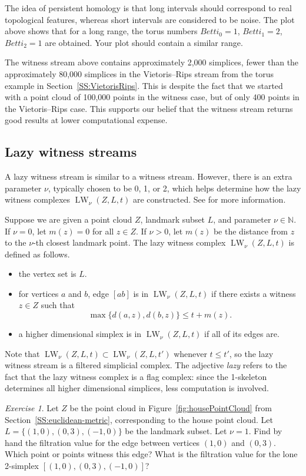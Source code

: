 \documentclass[amscd, amssymb, verbatim]{amsart}[12pt]
\theoremstyle{remark}
\newtheorem{exercise}{Exercise}
\theoremstyle{remark}
\theoremstyle{remark}
\DeclareMathOperator{\LW}{LW}
\newcommand{\N}{\mathbb{N}}
\begin{document}
The idea of persistent homology is that long intervals should correspond to real topological features, whereas short intervals are considered to be noise. The plot above shows that for a long range, the torus numbers $Betti_0 = 1$, $Betti_1 = 2$, $Betti_2 = 1$ are obtained. Your plot should contain a similar range.

The witness stream above contains approximately 2,000 simplices, fewer than the approximately 80,000 simplices in the Vietoris--Rips stream from the torus example in Section~\ref{SS:VietorisRips}. This is despite the fact that we started with a point cloud of 100,000 points in the witness case, but of only 400 points in the Vietoris--Rips case. This supports our belief that the witness stream returns good results at lower computational expense. 


\subsection{Lazy witness streams}
A lazy witness stream is similar to a witness stream. However, there is an extra parameter $\nu$, typically chosen to be 0, 1, or 2, which helps determine how the lazy witness complexes $\LW_\nu(Z,L,t)$ are constructed. See \citet{WitnessComplexes} for more information. 

Suppose we are given a point cloud $Z$, landmark subset $L$, and parameter $\nu\in\N$. If $\nu = 0$, let $m(z) = 0$ for all $z\in Z$. If $\nu >0$, let $m(z)$ be the distance from $z$ to the $\nu$-th closest landmark point. The lazy witness complex $\LW_\nu(Z,L,t)$ is defined as follows.
\begin{itemize}
\item{the vertex set is $L$.}
\item{for vertices $a$ and $b$, edge $[ab]$ is in $\LW_\nu(Z,L,t)$ if there exists a witness $z \in Z$ such that $$\max\bigl\{d(a,z), d(b,z)\bigr\} \leq t+m(z).$$}
\item{a higher dimensional simplex is in $\LW_\nu(Z,L,t)$ if all of its edges are.} 
\end{itemize}
Note that $\LW_\nu(Z,L,t) \subset \LW_\nu(Z,L,t')$ whenever $t\leq t'$, so the lazy witness stream is a filtered simplicial complex. The adjective {\em lazy} refers to the fact that the lazy witness complex is a flag complex: since the 1-skeleton determines all higher dimensional simplices, less computation is involved. 

\begin{exercise}
Let $Z$ be the point cloud in Figure~\ref{fig:housePointCloud} from Section~\ref{SS:euclidean-metric}, corresponding to the house point cloud. Let $L = \{(1,0),(0,3),(-1,0)\}$ be the landmark subset. Let $\nu = 1$. Find by hand the filtration value for the edge between vertices $(1,0)$ and $(0,3)$. Which point or points witness this edge? What is the filtration value for the lone 2-simplex $[(1,0),(0,3),(-1,0)]$? 
\end{exercise}
\end{document}
